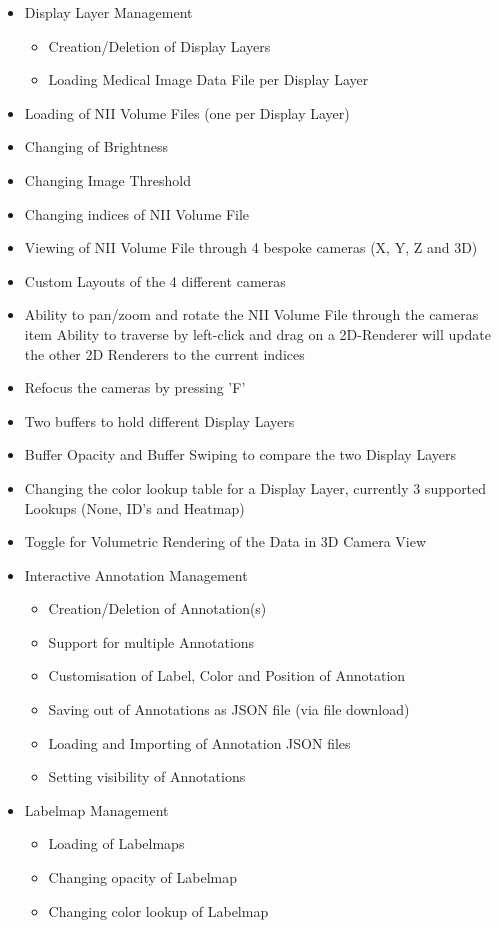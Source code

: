 \documentclass[a4paper,11pt,titlepage]{article}
\begin{document}
\begin{itemize}
\item Display Layer Management

  \begin{itemize}
  \item Creation/Deletion of Display Layers
  \item Loading Medical Image Data File per Display Layer
  \end{itemize}

\item Loading of NII Volume Files (one per Display Layer)	
\item Changing of Brightness
\item Changing Image Threshold
\item Changing indices of NII Volume File
\item Viewing of NII Volume File through 4 bespoke cameras (X, Y, Z and 3D)
\item Custom Layouts of the 4 different cameras
\item Ability to pan/zoom and rotate the NII Volume File through the cameras
  item Ability to traverse by left-click and drag on a 2D-Renderer will update the other 2D Renderers to the current indices
\item Refocus the cameras by pressing 'F'
\item Two buffers to hold different Display Layers
\item Buffer Opacity and Buffer Swiping to compare the two Display Layers
\item Changing the color lookup table for a Display Layer, currently 3 supported Lookups (None, ID's and Heatmap)
\item Toggle for Volumetric Rendering of the Data in 3D Camera View
\item Interactive Annotation Management

  \begin{itemize}
  \item Creation/Deletion of Annotation(s)
  \item Support for multiple Annotations
  \item Customisation of Label, Color and Position of Annotation
  \item Saving out of Annotations as JSON file (via file download)
  \item Loading and Importing of Annotation JSON files
  \item Setting visibility of Annotations
  \end{itemize}

\item Labelmap Management

  \begin{itemize}
  \item Loading of Labelmaps
  \item Changing opacity of Labelmap
  \item Changing color lookup of Labelmap
  \end{itemize}

\end{itemize}
\end{document}
